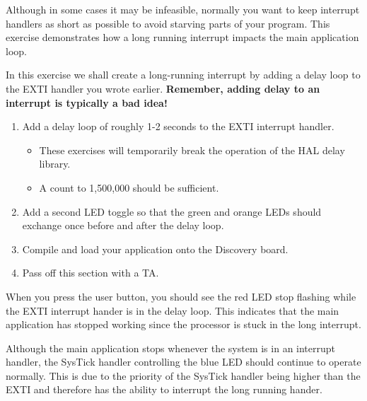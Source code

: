 \documentclass[openany,11pt,fleqn]{book} %
\begin{document}
\begin{assignment}
    \label{ex6}
   Although in some cases it may be infeasible, normally you want to keep interrupt handlers as short as possible to avoid starving parts of your program. This exercise demonstrates how a long running interrupt impacts the main application loop. 

   In this exercise we shall create a long-running interrupt by adding a delay loop to the EXTI handler you wrote earlier. \textbf{Remember, adding delay to an interrupt is typically a bad idea!} 
   \begin{enumerate}
       \item Add a delay loop of roughly 1-2 seconds to the EXTI interrupt handler.
       \begin{itemize}
           \item These exercises will temporarily break the operation of the HAL delay library.
           \item A count to 1,500,000 should be sufficient. 
       \end{itemize} 
       \item Add a second LED toggle so that the green and orange LEDs should exchange once before and after the delay loop. 
       \item Compile and load your application onto the Discovery board.
       \item Pass off this section with a TA.
   \end{enumerate}
   
    \noindent When you press the user button, you should see the red LED stop flashing while the EXTI interrupt hander is in the delay loop. This indicates that the main application has stopped working since the processor is stuck in the long interrupt. 
    
   Although the main application stops whenever the system is in an interrupt handler, the SysTick handler controlling the blue LED should continue to operate normally. This is due to the priority of the SysTick handler being higher than the EXTI and therefore has the ability to interrupt the long running hander. 
\end{assignment}
  
\end{document}
